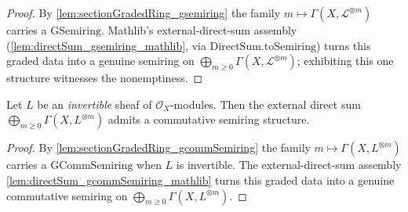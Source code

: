 \begin{proof}
  \leanok
  By \cref{lem:sectionGradedRing_gsemiring} the family \(m \mapsto
  \Gamma(X,\mathcal{L}^{\otimes m})\) carries a \(\mathrm{GSemiring}\). Mathlib's
  external-direct-sum assembly (\cref{lem:directSum_gsemiring_mathlib}, via
  \(\mathrm{DirectSum.toSemiring}\)) turns this graded data into a genuine semiring
  on \(\bigoplus_{m \ge 0} \Gamma(X,\mathcal{L}^{\otimes m})\); exhibiting this one
  structure witnesses the nonemptiness.
\end{proof}

\begin{lemma}

  \label{lem:sectionGradedRing_commSemiring_nonempty}
  Let \(L\) be an \emph{invertible} sheaf of \(\mathcal{O}_X\)-modules. Then the
  external direct sum \(\bigoplus_{m \ge 0} \Gamma(X, L^{\otimes m})\) admits a
  commutative semiring structure.
\end{lemma}

\begin{proof}
  \leanok
  By \cref{lem:sectionGradedRing_gcommSemiring} the family \(m \mapsto
  \Gamma(X, L^{\otimes m})\) carries a \(\mathrm{GCommSemiring}\) when \(L\) is
  invertible. The external-direct-sum assembly
  \cref{lem:directSum_gcommSemiring_mathlib} turns this graded data into a genuine
  commutative semiring on \(\bigoplus_{m \ge 0} \Gamma(X, L^{\otimes m})\).
\end{proof}

